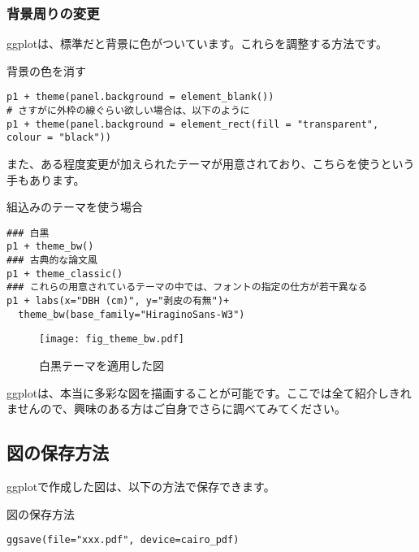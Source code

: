     \subsubsection{背景周りの変更}
ggplotは、標準だと背景に色がついています。これらを調整する方法です。
\begin{itembox}[l]{背景の色を消す}
\begin{verbatim}
p1 + theme(panel.background = element_blank())
# さすがに外枠の線ぐらい欲しい場合は、以下のように
p1 + theme(panel.background = element_rect(fill = "transparent", colour = "black"))
\end{verbatim}
\end{itembox}

また、ある程度変更が加えられたテーマが用意されており、こちらを使うという手もあります。
\begin{itembox}[l]{組込みのテーマを使う場合}
\begin{verbatim}
### 白黒
p1 + theme_bw()
### 古典的な論文風
p1 + theme_classic()
### これらの用意されているテーマの中では、フォントの指定の仕方が若干異なる
p1 + labs(x="DBH (cm)", y="剥皮の有無")+
  theme_bw(base_family="HiraginoSans-W3")
\end{verbatim}
\end{itembox}
\begin{figure}[htb]
\begin{center}
\graphicspath{{1_basic/figs/}}
\texttt{[image: fig\_theme\_bw.pdf]}\\
\caption{白黒テーマを適用した図}
 \label{themebw}
\end{center}
\end{figure}

ggplotは、本当に多彩な図を描画することが可能です。ここでは全て紹介しきれませんので、興味のある方はご自身でさらに調べてみてください。

  \subsection{図の保存方法}
ggplotで作成した図は、以下の方法で保存できます。
\begin{itembox}[l]{図の保存方法}
\begin{verbatim}
ggsave(file="xxx.pdf", device=cairo_pdf)
\end{verbatim}
\end{itembox}
